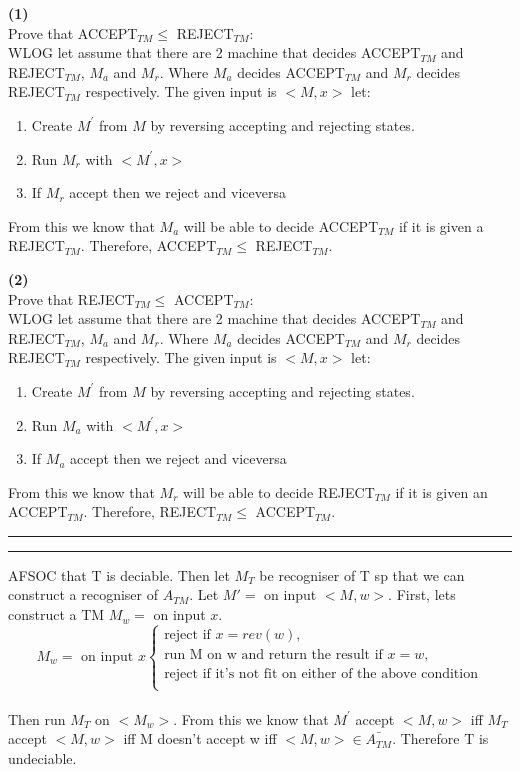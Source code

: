 \documentclass[a4paper, 11pt]{article}
\newcommand{\question}[2] {\vspace{.25in} \hrule\vspace{0.5em}
\noindent{\bf #1: #2} \vspace{0.5em}
\hrule \vspace{.10in}}
\renewcommand{\part}[1] {\vspace{.10in} {\bf (#1)}}
\begin{document}
\part{1}\\
Prove that ACCEPT$_{TM} \leq$ REJECT$_{TM}$:\\
WLOG let assume that there are 2 machine that decides ACCEPT$_{TM}$ and REJECT$_{TM}$, $M_a$ and $M_r$. Where $M_a$ decides ACCEPT$_{TM}$ and $M_r$ decides REJECT$_{TM}$ respectively. The given input is $<M,x>$ let:
\begin{enumerate}
	\item Create $M^{'}$ from $M$ by reversing accepting and rejecting states.
	\item Run $M_r$ with $<M^{'},x>$
	\item If $M_r$ accept then we reject and viceversa
\end{enumerate}
From this we know that $M_a$ will be able to decide ACCEPT$_{TM}$ if it is given a REJECT$_{TM}$. Therefore, ACCEPT$_{TM} \leq$ REJECT$_{TM}$.

\part{2}\\
Prove that REJECT$_{TM}$$\leq$ ACCEPT$_{TM}$:\\
WLOG let assume that there are 2 machine that decides ACCEPT$_{TM}$ and REJECT$_{TM}$, $M_a$ and $M_r$. Where $M_a$ decides ACCEPT$_{TM}$ and $M_r$ decides REJECT$_{TM}$ respectively. The given input is $<M,x>$ let:
\begin{enumerate}
	\item Create $M^{'}$ from $M$ by reversing accepting and rejecting states.
	\item Run $M_a$ with $<M^{'},x>$
	\item If $M_a$ accept then we reject and viceversa
\end{enumerate}
From this we know that $M_r$ will be able to decide REJECT$_{TM}$ if it is given an ACCEPT$_{TM}$. Therefore, REJECT$_{TM} \leq$ ACCEPT$_{TM}$.

\question{3}{Reverse on TM}
AFSOC that T is deciable. Then let $M_T$ be recogniser of T sp that we can construct a recogniser of $A_{TM}$. Let $M' = $ on input $<M,w>$. First, lets construct a TM $M_w = $ on input $x$.\\
\[
\text{$M_w = $ on input $x$}
\left\{
\begin{matrix}
\text{reject if } x = rev(w),\\ \text{run M on w and return the result if } x = w,\\ \text{reject if it's not fit on either of the above condition}\\
\end{matrix}
\right.
\]\\
Then run $M_T$ on $<M_w>$. From this we know that $M^{'}$ accept $<M,w>$ iff $M_T$ accept $<M,w>$ iff M doesn't accept w iff $<M,w> \in \bar{A_{TM}}$. Therefore T is undeciable.
\end{document}
